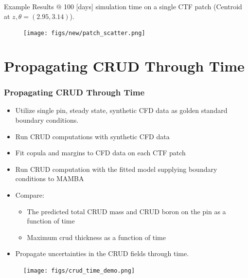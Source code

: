 \documentclass[t, pdftex]{beamer}
\begin{document}
\begin{frame}
\tiny Example Results $@$ 100 [days] simulation time on a single CTF patch (Centroid at $z,\theta=(2.95, 3.14)$). 
\begin{figure}[!htbp]
\centering
\texttt{[image: figs/new/patch\_scatter.png]}
\label{model_overview}
\end{figure}
\end{frame}

\section{Propagating CRUD Through Time}
\begin{frame}[shrink=2]
\frametitle{Propagating CRUD Through Time}
\begin{itemize}
\item Utilize single pin, steady state, synthetic CFD data as golden standard boundary conditions.
\item Run CRUD computations with synthetic CFD data 
\item Fit copula and margins to CFD data on each CTF patch 
\item Run CRUD computation with the fitted model supplying boundary conditions to MAMBA
\item Compare:
\begin{itemize}
\item The predicted total CRUD mass and CRUD boron on the pin as a function of time
\item Maximum crud thickness as a function of time
\end{itemize}
\item Propagate uncertainties in the CRUD fields through time.
\end{itemize}
\begin{figure}[!htbp]
\centering
\texttt{[image: figs/crud\_time\_demo.png]}
\label{model_overview}
\end{figure}
\end{frame}
\end{document}
